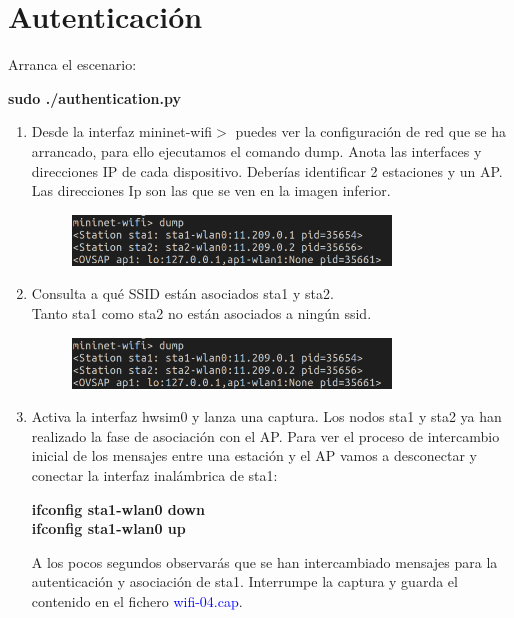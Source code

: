 \documentclass[12pt, a4paper]{report}
\begin{document}
\chapter{Autenticación}
Arranca el escenario:
\begin{center}
	\textbf{sudo ./authentication.py}
\end{center}
\begin{enumerate}
	\item Desde la interfaz mininet-wifi$>$ puedes ver la configuración de red que se ha arrancado, para ello
	ejecutamos el comando dump. Anota las interfaces y direcciones IP de cada dispositivo. Deberías
	identificar 2 estaciones y un AP.\\
	
	Las direcciones Ip son las que se ven en la imagen inferior.
	\begin{figure}[H]
		\centering
		\includegraphics[width=0.8\textwidth]{ej3.1}
	\end{figure}
	\item Consulta a qué SSID están asociados sta1 y sta2.\\
	
	Tanto sta1 como sta2 no están asociados a ningún ssid.
	\begin{figure}[H]
		\centering
		\includegraphics[width=0.8\textwidth]{ej3.1}
	\end{figure}
	\item Activa la interfaz hwsim0 y lanza una captura. Los nodos sta1 y sta2 ya han realizado la fase
	de asociación con el AP. Para ver el proceso de intercambio inicial de los mensajes entre una
	estación y el AP vamos a desconectar y conectar la interfaz inalámbrica de sta1:
	\begin{center}
		\textbf{ifconfig sta1-wlan0 down\\
			ifconfig sta1-wlan0 up}
	\end{center}
	A los pocos segundos observarás que se han intercambiado mensajes para la autenticación y
	asociación de sta1. Interrumpe la captura y guarda el contenido en el fichero \textcolor{blue}{wifi-04.cap}.\\
	

\end{enumerate}
\end{document}
